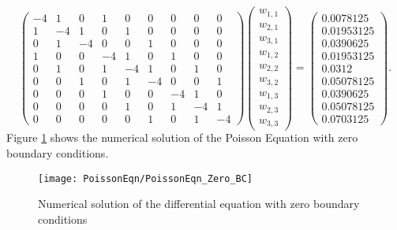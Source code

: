 \[\left(\begin{array}{ccccccccc}
-4& 1 & 0 &1 &0 &0 &0 &0 &0\\
1&-4& 1 & 0 &1 &0 &0 &0 &0 \\
0 &1&-4&  0&0 &1 &0 &0 &0 \\
1 &0 &0 &-4& 1 & 0 &1 &0 &0\\
0 & 1 &0 &1&-4& 1 &0 &1 &0  \\
0 &0 &1 &0 &1&-4&0&  0 &1  \\
0&0&0&1 &0 &0 &-4& 1 & 0\\
0&0&0&0 & 1 &0 &1&-4& 1   \\
0&0&0&0 &0 &1 &0 &1&-4
\end{array}\right)
\left(\begin{array}{c}
w_{1,1}\\
w_{2,1}\\
w_{3,1}\\
w_{1,2}\\
w_{2,2}\\
w_{3,2}\\
w_{1,3}\\
w_{2,3}\\
w_{3,3}
\end{array}\right)=
\left(\begin{array}{c}
0.0078125\\
0.01953125\\
0.0390625 \\
 0.01953125\\
 0.0312\\
0.05078125\\
0.0390625\\
0.05078125\\
0.0703125
\end{array}\right).
\]	
Figure \ref{SolPossZero} shows the numerical solution of the Poisson Equation with zero boundary conditions.
\begin{figure}[H]
  \caption{Numerical solution of the differential equation with zero boundary conditions }\label{SolPossZero}
  \centering
    \texttt{[image: PoissonEqn/PoissonEqn\_Zero\_BC]}
\end{figure}

